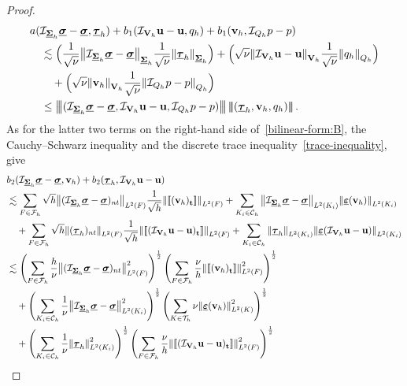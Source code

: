 \documentclass[a4paper,twoside,10pt]{article}
\theoremstyle{plain}
\theoremstyle{remark}
\theoremstyle{definition}
\numberwithin{equation}{section}
\numberwithin{figure}{section}
\newcommand{\Norm}[1]{{\left\|{#1} \right\|}}
\newcommand{\Normthreebars}[3]{\left|\!\left|\!\left| (#1,#2,#3) \right|\!\right|\!\right|}
\newcommand{\jump}[1]{\left[\!\left[#1\right]\!\right]}
\newcommand{\Ccalh}{\mathcal{C}_h}
\newcommand{\Tauh}{\mathcal{T}_h}
\newcommand{\K}{K}
\newcommand{\F}{F}
\newcommand{\Sigmah}{\underline{\boldsymbol{\Sigma}}_h}
\newcommand{\Vh}{{\bf{V}}_h}
\newcommand{\Qh}{Q_h}
\newcommand{\taubfh}{\underline{\boldsymbol{\tau}}_h}
\newcommand{\vbfh}{\mathbf{v}_h}
\newcommand{\qh}{q_h}
\newcommand{\sigmabf}{\underline{\boldsymbol{\sigma}}}
\newcommand{\ubf}{\mathbf{u}}
\newcommand{\normtang}{{nt}}
\DeclareMathOperator{\tang}{\bf{t}}
\newcommand{\Ltwo}{L^2}
\newcommand{\Fcalh}{\mathcal{F}_h}
\newcommand{\bone}{b_1}
\newcommand{\btwo}{b_2}
\newcommand{\epsbfun}{\underline{\boldsymbol{\varepsilon}}}
\newcommand{\Ki}{{\K_i}}
\newcommand{\IcalQhkmo}{\mathcal{I}_{\Qh}}
\newcommand{\IcalVhk}{\mathcal{I}_{\Vh}}
\newcommand{\IcalSigmahkmo}{\mathcal{I}_{\Sigmah}}
\begin{document}
\begin{proof}
\begin{equation}
\begin{split}
&a(\IcalSigmahkmo\sigmabf - \sigmabf,\taubfh) + \bone(\IcalVhk\ubf - \ubf,\qh) + \bone(\vbfh,\IcalQhkmo p - p) \\
&\quad\lesssim \Big(\frac{1}{\sqrt{\nu}}\Norm{\IcalSigmahkmo\sigmabf - \sigmabf}_{\Sigmah}\frac{1}{\sqrt{\nu}}\Norm{\taubfh}_{\Sigmah} \Big)
    + \Big(\sqrt{\nu}\Norm{\IcalVhk\ubf - \ubf}_{\Vh}\frac{1}{\sqrt{\nu}}\Norm{\qh}_{\Qh}\Big) \\
    &\qquad+ \Big(\sqrt{\nu}\Norm{\vbfh}_{\Vh}\frac{1}{\sqrt{\nu}}\Norm{\IcalQhkmo p - p}_{\Qh}\Big) \\
&\quad\leq \Normthreebars{\IcalSigmahkmo\sigmabf - \sigmabf}{\IcalVhk\ubf -\ubf}{\IcalQhkmo p - p}\Normthreebars{\taubfh}{\vbfh}{\qh}.
\end{split}
\end{equation}
As for the latter two terms on the right-hand side of~\eqref{bilinear-form:B},
the Cauchy--Schwarz inequality
and
the discrete trace inequality~\eqref{trace-inequality},
give
\begin{equation*} \label{btwo:estimate}
\begin{split}
&\btwo(\IcalSigmahkmo\sigmabf - \sigmabf,\vbfh) + \btwo(\taubfh,\IcalVhk\ubf - \ubf) \\
&\lesssim \sum_{\F \in \Fcalh} \sqrt{h}\Norm{(\IcalSigmahkmo\sigmabf - \sigmabf)_{\normtang}}_{\Ltwo(\F)}\frac{1}{\sqrt{h}}\Norm{\jump{(\vbfh)_{\tang}}}_{\Ltwo(\F)} 
    +\sum_{\Ki \in \Ccalh} \Norm{\IcalSigmahkmo\sigmabf - \sigmabf}_{\Ltwo(\Ki)}\Norm{\epsbfun(\vbfh)}_{\Ltwo(\Ki)} \\
&\quad+ \sum_{\F \in \Fcalh} \sqrt{h}\Norm{(\taubfh)_{\normtang}}_{\Ltwo(\F)}\frac{1}{\sqrt{h}}\Norm{\jump{(\IcalVhk\ubf - \ubf)_{\tang}}}_{\Ltwo(\F)} 
    +\sum_{\Ki \in \Ccalh} \Norm{\taubfh}_{\Ltwo(\Ki)}\Norm{\epsbfun(\IcalVhk\ubf - \ubf)}_{\Ltwo(\Ki)} \\
&\lesssim \left(\sum_{\F \in \Fcalh} \frac{h}{\nu}\Norm{(\IcalSigmahkmo\sigmabf - \sigmabf)_{\normtang}}^2_{\Ltwo(\F)}\right)^{\frac12}
          \left(\sum_{\F \in \Fcalh} \frac{\nu}{h}\Norm{\jump{(\vbfh)_{\tang}}}^2_{\Ltwo(\F)}\right)^{\frac12} \\
    &\quad+ \left(\sum_{\Ki \in \Ccalh} \frac{1}{\nu}\Norm{\IcalSigmahkmo\sigmabf - \sigmabf}^2_{\Ltwo(\Ki)}\right)^{\frac12}
             \left(\sum_{\K \in \Tauh}\nu\Norm{\epsbfun(\vbfh)}^2_{\Ltwo(\K)}\right)^{\frac12} \\
    &\quad+ \left(\sum_{\Ki \in \Ccalh} \frac{1}{\nu}\Norm{\taubfh}^2_{\Ltwo(\Ki)}\right)^{\frac12}
             \left(\sum_{\F \in \Fcalh} \frac{\nu}{{h}}\Norm{\jump{(\IcalVhk\ubf - \ubf)_{\tang}}}^2_{\Ltwo(\F)}\right)^{\frac12} \\

\end{split}
\end{equation*}
\end{proof}
\end{document}
